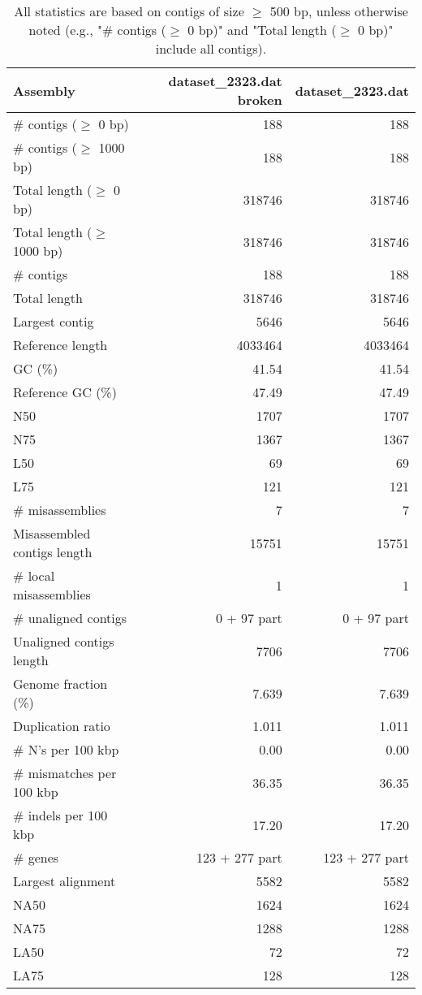 \documentclass[12pt,a4paper]{article}
\begin{document}
\begin{table}[ht]
\begin{center}
\caption{All statistics are based on contigs of size $\geq$ 500 bp, unless otherwise noted (e.g., "\# contigs ($\geq$ 0 bp)" and "Total length ($\geq$ 0 bp)" include all contigs).}
\begin{tabular}{|l*{2}{|r}|}
\hline
Assembly & dataset\_2323.dat broken & dataset\_2323.dat \\ \hline
\# contigs ($\geq$ 0 bp) & 188 & 188 \\ \hline
\# contigs ($\geq$ 1000 bp) & 188 & 188 \\ \hline
Total length ($\geq$ 0 bp) & 318746 & 318746 \\ \hline
Total length ($\geq$ 1000 bp) & 318746 & 318746 \\ \hline
\# contigs & 188 & 188 \\ \hline
Total length & 318746 & 318746 \\ \hline
Largest contig & 5646 & 5646 \\ \hline
Reference length & 4033464 & 4033464 \\ \hline
GC (\%) & 41.54 & 41.54 \\ \hline
Reference GC (\%) & 47.49 & 47.49 \\ \hline
N50 & 1707 & 1707 \\ \hline
N75 & 1367 & 1367 \\ \hline
L50 & 69 & 69 \\ \hline
L75 & 121 & 121 \\ \hline
\# misassemblies & 7 & 7 \\ \hline
Misassembled contigs length & 15751 & 15751 \\ \hline
\# local misassemblies & 1 & 1 \\ \hline
\# unaligned contigs & 0 + 97 part & 0 + 97 part \\ \hline
Unaligned contigs length & 7706 & 7706 \\ \hline
Genome fraction (\%) & 7.639 & 7.639 \\ \hline
Duplication ratio & 1.011 & 1.011 \\ \hline
\# N's per 100 kbp & 0.00 & 0.00 \\ \hline
\# mismatches per 100 kbp & 36.35 & 36.35 \\ \hline
\# indels per 100 kbp & 17.20 & 17.20 \\ \hline
\# genes & 123 + 277 part & 123 + 277 part \\ \hline
Largest alignment & 5582 & 5582 \\ \hline
NA50 & 1624 & 1624 \\ \hline
NA75 & 1288 & 1288 \\ \hline
LA50 & 72 & 72 \\ \hline
LA75 & 128 & 128 \\ \hline
\end{tabular}
\end{center}
\end{table}
\end{document}
